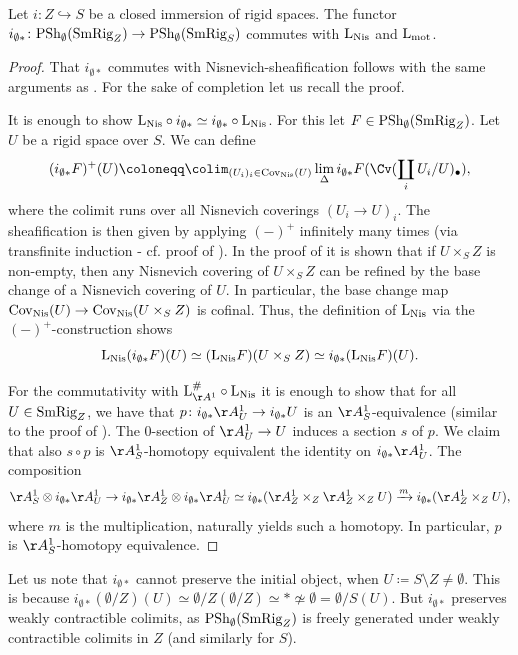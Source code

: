 \documentclass[colorinlistoftodos,article,11pt,reqno]{article}
\newcommand{\SmRig}{\textup{SmRig}}
\newcommand{\PSh}{\textup{PSh}}
\newcommand{\Nis}{\textup{Nis}}
\newcommand{\Arig}{\AA^{1}}
\renewcommand{\to}[1][]{\overset{#1}{\rightarrow}}
\renewcommand{\L}{\textup{L}}
\newcommand{\Lmot}{\L_{\textup{mot}}}
\newcommand{\es}{\emptyset}
\begin{document}
\begin{lem}
	Let $i\colon Z\hookrightarrow S$ be a closed immersion of rigid spaces. The functor\linebreak $i_{\es *}\colon \PSh_{\es}(\SmRig_{Z})\rightarrow  \PSh_{\es}(\SmRig_{S})$ commutes with $\L_{\Nis}$ and $\Lmot$.
\end{lem}
\begin{proof}
That $i_{\es*}$ commutes with Nisnevich-sheafification follows with the same arguments as  \cite[Lem. 1.4.19]{AyoubRig}. For the sake of completion let us recall the proof.\par 
	It is enough to show $\L_{\Nis}\circ i_{\es*}\simeq i_{\es *}\circ \L_{\Nis}$. For this let $F\in\PSh_{\es}(\SmRig_{Z})$. Let $U$ be a rigid space over $S$. We can define
	\[
		(i_{\es*}F)^{+}(U)\coloneqq \colim_{(U_{i})_{i}\in\textup{Cov}_{\Nis}(U)}\lim_{\Delta}i_{\es*}F(\Cv(\coprod_{i} U_{i}/U)_{\bullet}),
    \]
	where the colimit runs over all Nisnevich coverings $(U_{i}\to U)_{i}$. The sheafification is then given by applying $(-)^{+}$ infinitely many times (via transfinite induction - cf. proof of \cite[Prop. 6.2.2.7]{HTT}). In the proof of \cite[Lem. 2.2.4]{AGV} it is shown that if $U\times_{S}Z$ is non-empty, then any Nisnevich covering of $U\times_{S}Z$ can be refined by the base change of a Nisnevich covering of $U$. In particular, the base change map $\textup{Cov}_{\Nis}(U)\to \textup{Cov}_{\Nis}(U\times_{S}Z)$ is cofinal. Thus, the definition of $\L_{\Nis}$ via the $(-)^{+}$-construction shows
	\[
		\L_{\Nis}(i_{\es*}F)(U)\simeq (\L_{\Nis}F)(U\times_{S}Z)\simeq i_{\es*}(\L_{\Nis}F)(U).
	\]
	\par 
	For the commutativity with $\L^{\#}_{\Arig}\circ \L_{\Nis}$ it is enough to show that for all $U\in\SmRig_{Z}$, we have that $p\colon i_{\es*}\Arig_{U}\to i_{\es*}U$ is an $\Arig_{S}$-equivalence (similar to the proof of \cite[Prop. 1.4.18]{AyoubRig}). The $0$-section of $\Arig_{U}\to U$ induces a section $s$ of $p$. We claim that also $s\circ p$ is $\Arig_{S}$-homotopy equivalent the identity on $i_{\es *}\Arig_{U}$. The composition
	\[
		\Arig_{S}\otimes i_{\es *}\Arig_{U}\to i_{\es *}\Arig_{Z}\otimes  i_{\es *}\Arig_{U}\simeq i_{\es *}(\Arig_{Z}\times_{Z}\Arig_{Z}\times_{Z} U)\xrightarrow{m}i_{\es *}(\Arig_{Z}\times_{Z} U), 
	\]
	where $m$ is the multiplication, naturally yields such a homotopy. In particular, $p$ is $\Arig_{S}$-homotopy equivalence.
\end{proof}


\begin{rem}
\label{rem.closed.no-colim}
	Let us note that $i_{\es *}$ cannot preserve the initial object, when $U\coloneqq S\setminus Z\neq \es$. This is because $i_{\es*}(\es/Z)(U)\simeq \es/Z(\es/Z)\simeq \ast \not\simeq \es = \es/S(U)$. But $i_{\es *}$ preserves weakly contractible colimits, as $\PSh_{\es}(\SmRig_{Z})$ is freely generated under weakly contractible colimits in $Z$ (and similarly for $S$).
\end{rem}
\end{document}
